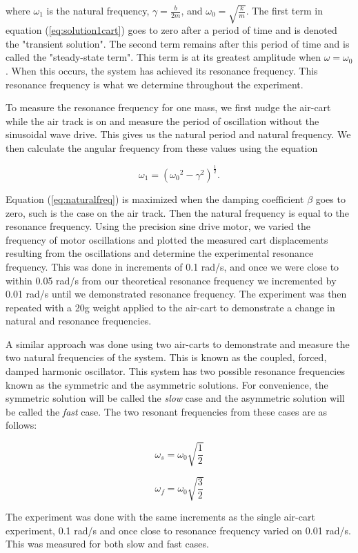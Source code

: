 \noindent where $\omega_1$ is the natural frequency, $\gamma = \frac{b}{2m}$, and $\omega_0 = \sqrt{\frac{k}{m}}$. The first term in equation (\ref{eq:solution1cart}) goes to zero after a period of time and is denoted the "transient solution". The second term remains after this period of time and is called the "steady-state term". This term is at its greatest amplitude when $\omega = \omega_0$. When this occurs, the system has achieved its resonance frequency. This resonance frequency is what we determine throughout the experiment.

\par To measure the resonance frequency for one mass, we first nudge the air-cart while the air track is on and measure the period of oscillation without the sinusoidal wave drive. This gives us the natural period and natural frequency. We then calculate the angular frequency from these values using the equation

\begin{equation}
\omega _1 = ({\omega_0}^2 - \gamma ^ 2)^{\frac{1}{2}}.
\label{eq:naturalfreq}
\end{equation}


\noindent Equation (\ref{eq:naturalfreq}) is maximized when the damping coefficient $\beta$ goes to zero, such is the case on the air track. Then the natural frequency is equal to the resonance frequency. Using the precision sine drive motor, we varied the frequency of motor oscillations and plotted the measured cart displacements resulting from the oscillations and determine the experimental resonance frequency. This was done in increments of 0.1 rad/s, and once we were close to within 0.05 rad/s from our theoretical resonance frequency we incremented by 0.01 rad/s until we demonstrated resonance frequency. The experiment was then repeated with a 20g weight applied to the air-cart to demonstrate a change in natural and resonance frequencies.

\par A similar approach was done using two air-carts to demonstrate and measure the two natural frequencies of the system. This is known as the coupled, forced, damped harmonic oscillator. This system has two possible resonance frequencies known as the symmetric and the asymmetric solutions. For convenience, the symmetric solution will be called the \textit{slow} case and the asymmetric solution will be called the \textit{fast} case. The two resonant frequencies from these cases are as follows:

\begin{equation}
\omega_s = \omega_0 \sqrt{\frac{1}{2}}
\label{eq:slow}
\end{equation}

\begin{equation}
\omega_f = \omega_0 \sqrt{\frac{3}{2}}
\label{eq:fast}
\end{equation}

\noindent The experiment was done with the same increments as the single air-cart experiment, 0.1 rad/s and once close to resonance frequency varied on 0.01 rad/s. This was measured for both slow and fast cases.




